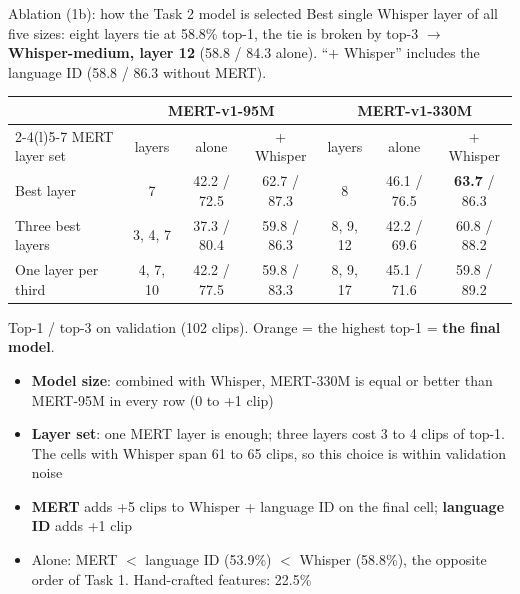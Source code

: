 \documentclass[aspectratio=169,11pt]{beamer}
\newcommand{\best}[1]{\textbf{\alert{#1}}}                       %
\newenvironment{tight}{\begin{itemize}\setlength{\itemsep}{1.5pt}\setlength{\parskip}{0pt}\setlength{\topsep}{0pt}}{\end{itemize}}
\begin{document}
\begin{frame}[t]{Ablation (1b): how the Task 2 model is selected}
  \footnotesize
  Best single Whisper layer of all five sizes: eight layers tie at 58.8\% top-1, the tie is broken by top-3 $\rightarrow$ \textbf{Whisper-medium, layer 12} (58.8 / 84.3 alone). ``+ Whisper'' includes the language ID (58.8 / 86.3 without MERT).
  \vspace{0.2em}

  \centering
  {\footnotesize\setlength{\tabcolsep}{4.5pt}\renewcommand{\arraystretch}{0.9}
  \begin{tabular}{@{}l ccc ccc@{}}
    \toprule
    & \multicolumn{3}{c}{MERT-v1-95M} & \multicolumn{3}{c}{MERT-v1-330M} \\ \cmidrule(lr){2-4}\cmidrule(l){5-7}
    MERT layer set & layers & alone & + Whisper & layers & alone & + Whisper \\ \midrule
    Best layer & 7 & 42.2 / 72.5 & 62.7 / 87.3 & 8 & 46.1 / 76.5 & \best{63.7} / 86.3 \\
    Three best layers & 3, 4, 7 & 37.3 / 80.4 & 59.8 / 86.3 & 8, 9, 12 & 42.2 / 69.6 & 60.8 / 88.2 \\
    One layer per third & 4, 7, 10 & 42.2 / 77.5 & 59.8 / 83.3 & 8, 9, 17 & 45.1 / 71.6 & 59.8 / 89.2 \\
    \bottomrule
  \end{tabular}}
  \vspace{0.1em}

  \raggedright
  {\scriptsize\color{gray}Top-1 / top-3 on validation (102 clips). Orange = the highest top-1 = \textbf{the final model}.\par}
  \begin{tight}\footnotesize
    \item \textbf{Model size}: combined with Whisper, MERT-330M is equal or better than MERT-95M in every row (0 to +1 clip)
    \item \textbf{Layer set}: one MERT layer is enough; three layers cost 3 to 4 clips of top-1. The cells with Whisper span 61 to 65 clips, so this choice is within validation noise
    \item \textbf{MERT} adds +5 clips to Whisper + language ID on the final cell; \textbf{language ID} adds +1 clip
    \item Alone: MERT $<$ language ID (53.9\%) $<$ Whisper (58.8\%), the opposite order of Task 1. Hand-crafted features: 22.5\%
  \end{tight}
\end{frame}
\end{document}
